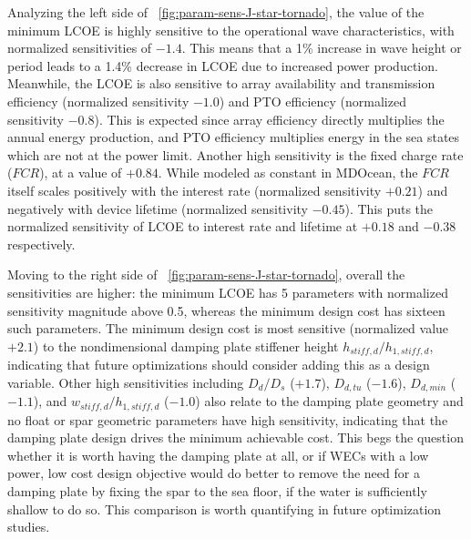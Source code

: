 Analyzing the left side of \figureautorefname~\ref{fig:param-sens-J-star-tornado}, the value of the minimum LCOE is highly sensitive to the operational wave characteristics, with normalized sensitivities of $-1.4$. This means that a 1\% increase in wave height or period leads to a 1.4\% decrease in LCOE due to increased power production. Meanwhile, the LCOE is also sensitive to array availability and transmission efficiency (normalized sensitivity $-1.0$) and PTO efficiency (normalized sensitivity $-0.8$). This is expected since array efficiency directly multiplies the annual energy production, and PTO efficiency multiplies energy in the sea states which are not at the power limit. Another high sensitivity is the fixed charge rate ($FCR$), at a value of $+0.84$. While modeled as constant in MDOcean, the $FCR$ itself scales positively with the interest rate (normalized sensitivity $+0.21$) and negatively with device lifetime (normalized sensitivity $-0.45$). This puts the normalized sensitivity of LCOE to interest rate and lifetime at $+0.18$ and $-0.38$ respectively.

Moving to the right side of \figureautorefname~\ref{fig:param-sens-J-star-tornado}, overall the sensitivities are higher: the minimum LCOE has 5 parameters with normalized sensitivity magnitude above 0.5, whereas the minimum design cost has sixteen such parameters. The minimum design cost is most sensitive (normalized value $+2.1$) to the nondimensional damping plate stiffener height $h_{stiff,d}/h_{1,stiff,d}$, indicating that future optimizations should consider adding this as a design variable. Other high sensitivities including $D_d/D_s$ ($+1.7$), $D_{d,tu}$ ($-1.6$), $D_{d,min}$ ($-1.1$), and $w_{stiff,d}/h_{1,stiff,d}$ ($-1.0$) also relate to the damping plate geometry and no float or spar geometric parameters have high sensitivity, indicating that the damping plate design drives the minimum achievable cost. This begs the question whether it is worth having the damping plate at all, or if WECs with a low power, low cost design objective would do better to remove the need for a damping plate by fixing the spar to the sea floor, if the water is sufficiently shallow to do so. This comparison is worth quantifying in future optimization studies. 

